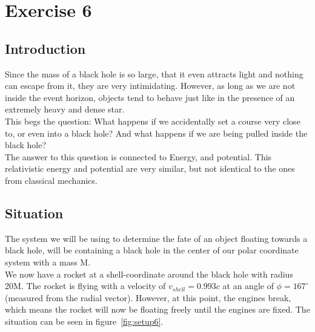 \documentclass[reprint,english,notitlepage]{revtex4-2}
\begin{document}
\section{Exercise 6}\label{sec:exercise-6}
    \subsection{Introduction}\label{subsec:introduction6}
        Since the mass of a black hole is so large, that it even attracts light and nothing can escape from it, they are very intimidating.
        However, as long as we are not inside the event horizon, objects tend to behave just like in the presence of an extremely heavy and dense star.\\
        This begs the question: What happens if we accidentally set a course very close to, or even into a black hole?
        And what happens if we are being pulled inside the black hole?\\
        The answer to this question is connected to Energy, and potential.
        This relativistic energy and potential are very similar, but not identical to the ones from classical mechanics.


    \subsection{Situation}\label{subsec:situation6}
        The system we will be using to determine the fate of an object floating towards a black hole, will be containing a black hole in the center of our polar coordinate system with a mass M.\\
        We now have a rocket at a shell-coordinate around the black hole with radius 20M.
        The rocket is flying with a velocity of $v_{shell} = 0.993c$ at an angle of $\phi = 167^{\circ}$ (measured from the radial vector).
        However, at this point, the engines break, which means the rocket will now be floating freely until the engines are fixed.
        The situation can be seen in figure~\ref{fig:setup6}.
\end{document}
